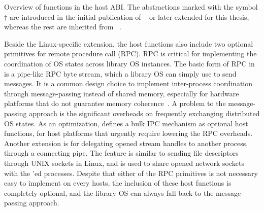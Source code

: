 \begin{table}[htp!]
\centering

\caption{Overview of functions in the \graphene{} host ABI. The abstractions marked with the symbol $\dagger$ are introduced in the initial publication of \graphene{}~\cite{tsai14graphene} or later extended for this thesis, whereas the rest are inherited from \drawbridge{}~\cite{porter11drawbridge}.}
\label{tab:overview:abi}
\end{table}




Beside the Linux-specific extension,
the host functions also include two optional primitives for remote procedure call (RPC).
RPC is critical for implementing the coordination of OS states
across library OS instances.
The basic form of RPC in \graphene{} is a pipe-like RPC byte stream, which a library OS can simply use to send messages.
It is a common design choice
to implement inter-process coordination through message-passing
instead of shared memory, especially for hardware platforms that do not guarantee memory coherence~\cite{baumann09barrelfish}.
A problem to the message-passing approach is the significant overheads
on frequently exchanging distributed OS states.
As an optimization, \graphene{} defines a bulk IPC mechanism
as optional host functions,
for host platforms that urgently require lowering the RPC overheads.
Another extension is for
delegating opened stream handles to another process, through a connecting pipe.
The feature is similar to sending file descriptors
through UNIX sockets in Linux, and is used to share opened network sockets with the 'ed processes.
Despite that either of the RPC primitives
is not necessary easy to implement on every hosts, the inclusion of these host functions is completely optional, and the library OS can always fall back to the message-passing approach.



